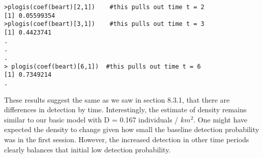 \begin{verbatim}
>plogis(coef(beart)[2,1])    #this pulls out time t = 2
[1] 0.05599354
>plogis(coef(beart)[3,1])    #this pulls out time t = 3
[1] 0.4423741
.
.
.
> plogis(coef(beart)[6,1])  #this pulls out time t = 6
[1] 0.7349214
.
\end{verbatim}

These results suggest the same as we saw in section 8.3.1, that there are differences in detection by time.  Interestingly, the estimate of density remains similar to our basic model with D = 0.167 individuals / $km ^2$.   One might have expected the density to change given how small the baseline detection probability was in the first session.  However, the increased detection in other time periods clearly balances that initial low detection probability.